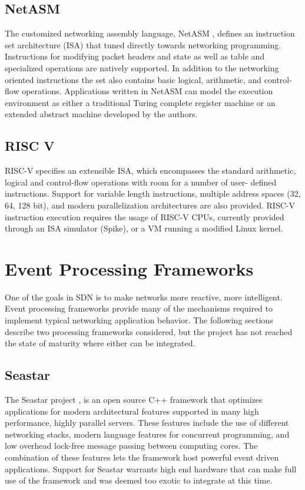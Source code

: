 \subsection{NetASM}
\label{related:netasm}
The customized networking assembly language, NetASM \cite{netasm}, defines an
instruction set architecture (ISA) that tuned directly towards networking
programming. Instructions for modifying packet headers and state as well
as table and specialized operations are natively supported. In addition to the
networking oriented instructions the set also contains basic logical,
arithmetic, and control-flow operations. Applications written in NetASM can
model the execution environment as either a traditional Turing complete
register machine or an extended abstract machine developed by the authors.

\subsection{RISC V}
\label{related:riscv}
RISC-V \cite{riscv} specifies an extensible ISA, which encompasses the standard
arithmetic, logical and control-flow operations with room for a number of user-
defined instructions. Support for variable length instructions, multiple
address spaces (32, 64, 128 bit), and modern parallelization architectures are
also provided. RISC-V instruction execution requires the usage of RISC-V CPUs,
currently provided through an ISA simulator (Spike), or a VM running a modified
Linux kernel.

\section{Event Processing Frameworks}
\label{related:event}
One of the goals in SDN is to make networks more reactive, more intelligent.
Event processing frameworks provide many of the mechanisms required to implement
typical networking application behavior. The following sections describe two
processing frameworks considered, but the project has not reached the state
of maturity where either can be integrated.

\subsection{Seastar}
\label{related:seastar}
The Seastar project \cite{seastar}, is an open source C++ framework that
optimizes applications for modern architectural features supported in many high
performance, highly parallel servers. These features include the use of different
networking stacks, modern language features for concurrent programming, and low
overhead lock-free message passing between computing cores. The combination of
these features lets the framework host powerful event driven applications.
Support for Seastar warrants high end hardware that can make full use of the
framework and was deemed too exotic to integrate at this time.


